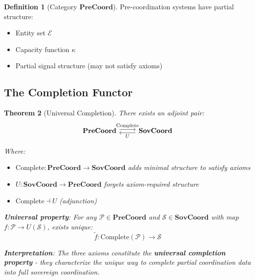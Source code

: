 \documentclass[11pt,a4paper]{article}
\newtheorem{theorem}{Theorem}[section]
\theoremstyle{definition}
\newtheorem{definition}[theorem]{Definition}
\theoremstyle{remark}
\newcommand{\E}{\mathcal{E}}
\newcommand{\SovCoord}{\mathbf{SovCoord}}
\begin{document}
\begin{definition}[Category $\mathbf{PreCoord}$]
Pre-coordination systems have partial structure:
\begin{itemize}
\item Entity set $\E$
\item Capacity function $\kappa$
\item Partial signal structure (may not satisfy axioms)
\end{itemize}
\end{definition}

\subsection{The Completion Functor}

\begin{theorem}[Universal Completion]
\label{thm:universal-completion}
There exists an adjoint pair:
\[
\begin{tikzcd}
\mathbf{PreCoord} \arrow[r, shift left, "\text{Complete}"] & 
\SovCoord \arrow[l, shift left, "U"]
\end{tikzcd}
\]

Where:
\begin{itemize}
\item $\text{Complete}: \mathbf{PreCoord} \to \SovCoord$ adds minimal structure to satisfy axioms
\item $U: \SovCoord \to \mathbf{PreCoord}$ forgets axiom-required structure
\item $\text{Complete} \dashv U$ (adjunction)
\end{itemize}

\textbf{Universal property}: For any $\mathcal{P} \in \mathbf{PreCoord}$ and $\mathcal{S} \in \SovCoord$ with map $f: \mathcal{P} \to U(\mathcal{S})$, exists unique:
\[ \tilde{f}: \text{Complete}(\mathcal{P}) \to \mathcal{S} \]

\textbf{Interpretation}: The three axioms constitute the \textbf{universal completion property} - they characterize the unique way to complete partial coordination data into full sovereign coordination.
\end{theorem}
\end{document}
